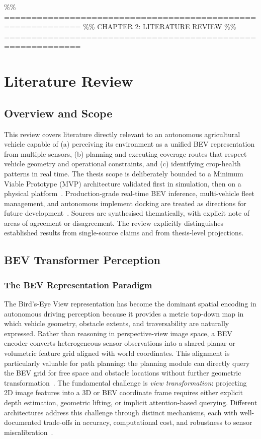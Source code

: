 \documentclass[12pt, a4paper]{article}
\begin{document}
\%\% ============================================================
\%\% CHAPTER 2: LITERATURE REVIEW
\%\% ============================================================
\chapter{Literature Review}
\label{ch:litreview}

\section{Overview and Scope}

This review covers literature directly relevant to an autonomous agricultural vehicle
capable of (a) perceiving its environment as a unified BEV representation from multiple
sensors, (b) planning and executing coverage routes that respect vehicle geometry and
operational constraints, and (c) identifying crop-health patterns in real time. The thesis
scope is deliberately bounded to a Minimum Viable Prototype (MVP) architecture validated
first in simulation, then on a physical platform~\cite{ref1}. Production-grade real-time
BEV inference, multi-vehicle fleet management, and autonomous implement docking are treated
as directions for future development~\cite{ref3}. Sources are synthesised thematically,
with explicit note of areas of agreement or disagreement. The review explicitly
distinguishes established results from single-source claims and from thesis-level
projections.

\section{BEV Transformer Perception}

\subsection{The BEV Representation Paradigm}

The Bird's-Eye View representation has become the dominant spatial encoding in autonomous
driving perception because it provides a metric top-down map in which vehicle geometry,
obstacle extents, and traversability are naturally expressed. Rather than reasoning in
perspective-view image space, a BEV encoder converts heterogeneous sensor observations
into a shared planar or volumetric feature grid aligned with world coordinates. This
alignment is particularly valuable for path planning: the planning module can directly
query the BEV grid for free space and obstacle locations without further geometric
transformation~\cite{ref2, ref3}. The fundamental challenge is \emph{view transformation}:
projecting 2D image features into a 3D or BEV coordinate frame requires either explicit
depth estimation, geometric lifting, or implicit attention-based querying. Different
architectures address this challenge through distinct mechanisms, each with well-documented
trade-offs in accuracy, computational cost, and robustness to sensor
miscalibration~\cite{ref13, ref48, ref49}.
\end{document}
